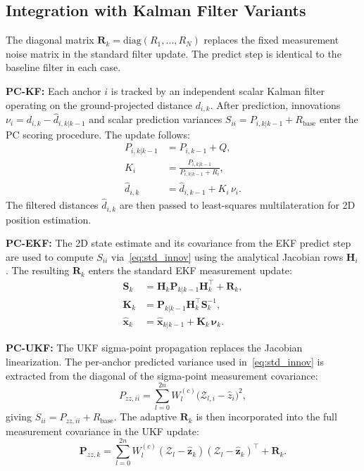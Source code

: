 \documentclass[journal]{IEEEtran}
\newcommand{\mbf}[1]{\mathbf{#1}}
\begin{document}
\subsection{Integration with Kalman Filter Variants}

The diagonal matrix $\mbf{R}_k = \mathrm{diag}(R_1, \ldots, R_N)$ replaces the fixed measurement noise matrix in the standard filter update. The predict step is identical to the baseline filter in each case.

\textbf{PC-KF:} Each anchor $i$ is tracked by an independent scalar Kalman filter operating on the ground-projected distance $d_{i,k}$. After prediction, innovations $\nu_i = d_{i,k} - \hat{d}_{i,k|k-1}$ and scalar prediction variances $S_{ii} = P_{i,k|k-1} + R_{\text{base}}$ enter the PC scoring procedure. The update follows:
\begin{align}
    P_{i,k|k-1} &= P_{i,k-1} + Q, \label{eq:pckf_predict} \\
    K_i          &= \frac{P_{i,k|k-1}}{P_{i,k|k-1} + R_i}, \label{eq:pckf_gain} \\
    \hat{d}_{i,k}&= \hat{d}_{i,k-1} + K_i\,\nu_i. \label{eq:pckf_update}
\end{align}
The filtered distances $\hat{d}_{i,k}$ are then passed to least-squares multilateration for 2D position estimation.

\textbf{PC-EKF:} The 2D state estimate and its covariance from the EKF predict step are used to compute $S_{ii}$ via~\eqref{eq:std_innov} using the analytical Jacobian rows $\mbf{H}_i$. The resulting $\mbf{R}_k$ enters the standard EKF measurement update:
\begin{align}
    \mbf{S}_k         &= \mbf{H}_k \mbf{P}_{k|k-1} \mbf{H}_k^\top + \mbf{R}_k, \\
    \mbf{K}_k         &= \mbf{P}_{k|k-1} \mbf{H}_k^\top \mbf{S}_k^{-1}, \\
    \hat{\mbf{x}}_k   &= \hat{\mbf{x}}_{k|k-1} + \mbf{K}_k\,\boldsymbol{\nu}_k.
\end{align}

\textbf{PC-UKF:} The UKF sigma-point propagation replaces the Jacobian linearization. The per-anchor predicted variance used in~\eqref{eq:std_innov} is extracted from the diagonal of the sigma-point measurement covariance:
\begin{equation}\label{eq:ukf_sii}
    P_{zz,ii} = \sum_{l=0}^{2n} W_l^{(c)} \bigl(\mathcal{Z}_{l,i} - \hat{z}_i\bigr)^2,
\end{equation}
giving $S_{ii} = P_{zz,ii} + R_{\text{base}}$. The adaptive $\mbf{R}_k$ is then incorporated into the full measurement covariance in the UKF update:
\begin{equation}
    \mbf{P}_{zz,k} = \sum_{l=0}^{2n} W_l^{(c)} (\boldsymbol{\mathcal{Z}}_l - \hat{\mbf{z}}_k)(\boldsymbol{\mathcal{Z}}_l - \hat{\mbf{z}}_k)^\top + \mbf{R}_k.
\end{equation}
\end{document}
